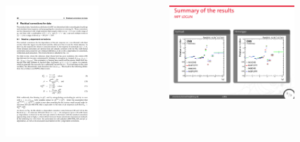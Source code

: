 {\begin{columns}[T]
\begin{figure}[T]
			\centering
			\includegraphics[width=3.5cm]{images/l2equations.pdf}%
			\label{fig:L2Residual_equations}
		\end{figure}
                \vspace{-.75cm}
		\begin{figure}[T]
			\centering
			\includegraphics[width=4.7cm]{images/l2res.pdf}%
			\label{fig:L2Residual}
		\end{figure}
	\end{columns}
}
